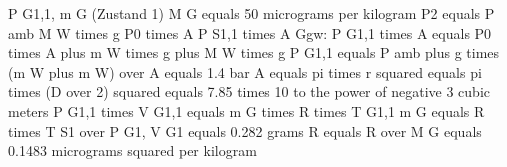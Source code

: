 P G1,1, m G (Zustand 1)  
M G equals 50 micrograms per kilogram  
P2 equals P amb  
M W times g  
P0 times A  
P S1,1 times A  
Ggw:  
P G1,1 times A equals P0 times A plus m W times g plus M W times g  
P G1,1 equals P amb plus g times (m W plus m W) over A  
equals 1.4 bar  
A equals pi times r squared equals pi times (D over 2) squared equals 7.85 times 10 to the power of negative 3 cubic meters  
P G1,1 times V G1,1 equals m G times R times T G1,1  
m G equals R times T S1 over P G1, V G1 equals 0.282 grams  
R equals R over M G equals 0.1483 micrograms squared per kilogram